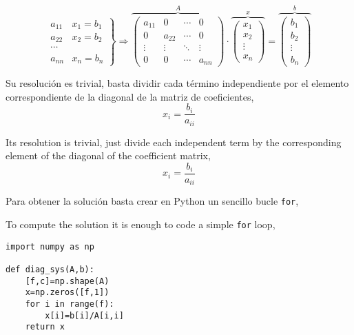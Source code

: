 \begin{equation*}
\left. \begin{aligned}
a_{11}&x_1=b_1\\
a_{22}&x_2=b_2\\
\cdots & \\
a_{nn}&x_n=b_n
\end{aligned}\right\} \Rightarrow	\overbrace{\begin{pmatrix}
a_{11}& 0& \cdots & 0\\
0& a_{22}& \cdots & 0\\
\vdots & \vdots & \ddots & \vdots\\
0& 0& \cdots & a_{nn}
\end{pmatrix}}^A \cdot \overbrace{\begin{pmatrix}
x_1\\
x_2\\
\vdots \\
x_n
\end{pmatrix}}^x=\overbrace{\begin{pmatrix}
b_1\\
b_2\\
\vdots \\
b_n
\end{pmatrix}}^b
\end{equation*}

\begin{paracol}{2}
Su resolución es trivial, basta dividir cada término independiente por el elemento correspondiente de la diagonal de la matriz de coeficientes,
\begin{equation*}
x_i=\frac{b_i}{a_{ii}}
\end{equation*}

\switchcolumn
Its resolution is trivial, just divide each independent term by the corresponding element of the diagonal of the coefficient matrix,
\begin{equation*}
x_i=\frac{b_i}{a_{ii}}
\end{equation*}

\switchcolumn
Para obtener la solución basta crear en Python un sencillo bucle \texttt{for},

\switchcolumn
To compute the solution it is enough to code a simple \texttt{for} loop,
\end{paracol}

\begin{verbatim}
import numpy as np

def diag_sys(A,b):
    [f,c]=np.shape(A)
    x=np.zeros([f,1])
    for i in range(f):
        x[i]=b[i]/A[i,i]
    return x
\end{verbatim}


